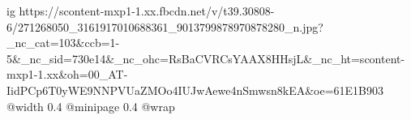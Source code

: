  
 
 
 
 

\ifcmt
  ig https://scontent-mxp1-1.xx.fbcdn.net/v/t39.30808-6/271268050_3161917010688361_9013799878970878280_n.jpg?_nc_cat=103&ccb=1-5&_nc_sid=730e14&_nc_ohc=RsBaCVRCsYAAX8HHsjL&_nc_ht=scontent-mxp1-1.xx&oh=00_AT-IidPCp6T0yWE9NNPVUaZMOo4IUJwAewe4nSmwsn8kEA&oe=61E1B903
  @width 0.4
  @minipage 0.4
  @wrap \parpic[r]
\fi
